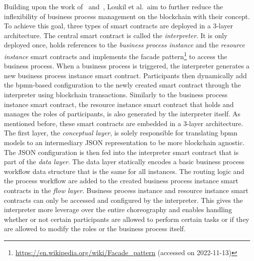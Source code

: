 Building upon the work of~\cite{lean_architecture_for_blockchain_based_process_execution} and~\cite{interpreted_bp_on_blockchain_weber}, Loukil et al.\ aim to further reduce the inflexibility of business process management on the blockchain with their concept. To achieve this goal, three types of smart contracts are deployed in a 3-layer architecture. The central smart contract is called the \textit{interpreter}. It is only deployed once, holds references to the \textit{business process instance} and the \textit{resource instance} smart contracts and implements the facade pattern\footnote{\url{https://en.wikipedia.org/wiki/Facade_pattern} (accessed on 2022-11-13)} to access the business process. When a business process is triggered, the interpreter generates a new business process instance smart contract. Participants then dynamically add the \gls{bpmn}-based configuration to the newly created smart contract through the interpreter using blockchain transactions. Similarly to the business process instance smart contract, the resource instance smart contract that holds and manages the roles of participants, is also generated by the interpreter itself. As mentioned before, these smart contracts are embedded in a 3-layer architecture. The first layer, the \textit{conceptual layer}, is solely responsible for translating \gls{bpmn} models to an intermediary JSON representation to be more blockchain agnostic. The JSON configuration is then fed into the interpreter smart contract that is part of the \textit{data layer}. The data layer statically encodes a basic business process workflow data structure that is the same for all instances. The routing logic and the process workflow are added to the created business process instance smart contracts in the \textit{flow layer}. Business process instance and resource instance smart contracts can only be accessed and configured by the interpreter. This gives the interpreter more leverage over the entire choreography and enables handling whether or not certain participants are allowed to perform certain tasks or if they are allowed to modify the roles or the business process itself.

